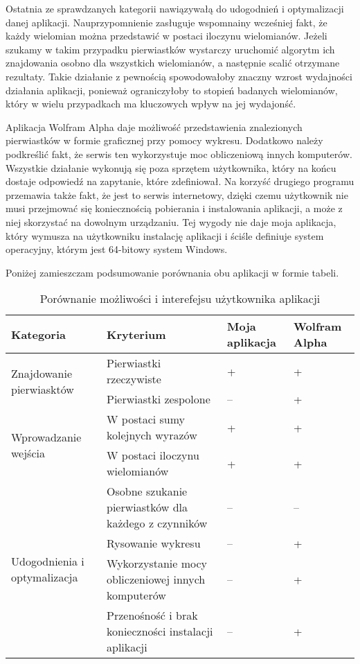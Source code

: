 \documentclass[oneside,a4paper]{book}
\begin{document}
	Ostatnia ze sprawdzanych kategorii nawiązywałą do udogodnień i optymalizacji danej aplikacji. Nauprzypomnienie zasługuje wspomnainy wcześniej fakt, że każdy wielomian można przedstawić w postaci iloczynu wielomianów. Jeżeli szukamy w takim przypadku pierwiastków wystarczy uruchomić algorytm ich znajdowania osobno dla wszystkich wielomianów, a następnie scalić otrzymane rezultaty. Takie działanie z pewnością spowodowałoby znaczny wzrost wydajności działania aplikacji, ponieważ ograniczyłoby to stopień badanych wielomianów, który w wielu przypadkach ma kluczowych wpływ na jej wydajonść.
	
	Aplikacja Wolfram Alpha daje możliwość przedstawienia znalezionych pierwiastków w formie graficznej przy pomocy wykresu. Dodatkowo należy podkreślić fakt, że serwis ten wykorzystuje moc obliczeniową innych komputerów. Wszystkie działanie wykonują się poza sprzętem użytkownika, który na końcu dostaje odpowiedź na zapytanie, które zdefiniował. Na korzyść drugiego programu przemawia także fakt, że jest to serwis internetowy, dzięki czemu użytkownik nie musi przejmować się koniecznością pobierania i instalowania aplikacji, a może z niej skorzystać na dowolnym urządzaniu. Tej wygody nie daje moja aplikacja, który wymusza na użytkowniku instalację aplikacji i ściśle definiuje system operacyjny, którym jest 64-bitowy system Windows.
	
	Poniżej zamieszczam podsumowanie porównania obu aplikacji w formie tabeli.
	
	\begin{table}
	\caption{Porównanie możliwości i interefejsu użytkownika aplikacji}
		\begin{tabular}{ |p{4.7cm}|p{5.5cm}|p{1.5cm}|p{1.5cm}| } 
			\hline
			Kategoria & Kryterium & Moja aplikacja & Wolfram Alpha \\
			\hline
			\multirow{2}{*}{Znajdowanie pierwiasktów}
			& Pierwiastki rzeczywiste & + & + \\
			& Pierwiastki zespolone & -- & + \\
			\hline
			\multirow{2}{*}{Wprowadzanie wejścia}
			&W postaci sumy kolejnych wyrazów & + & + \\
			&W postaci iloczynu wielomianów & + & + \\
			\hline
			\multirow{4}{*}{Udogodnienia i optymalizacja}
			&Osobne szukanie pierwiastków dla każdego z czynników & -- & -- \\
			&Rysowanie wykresu & -- & + \\
			&Wykorzystanie mocy obliczeniowej innych komputerów & -- & + \\
			&Przenośność i brak konieczności instalacji aplikacji & -- & + \\
			\hline
		\end{tabular}
	\end{table}
	
\end{document}
